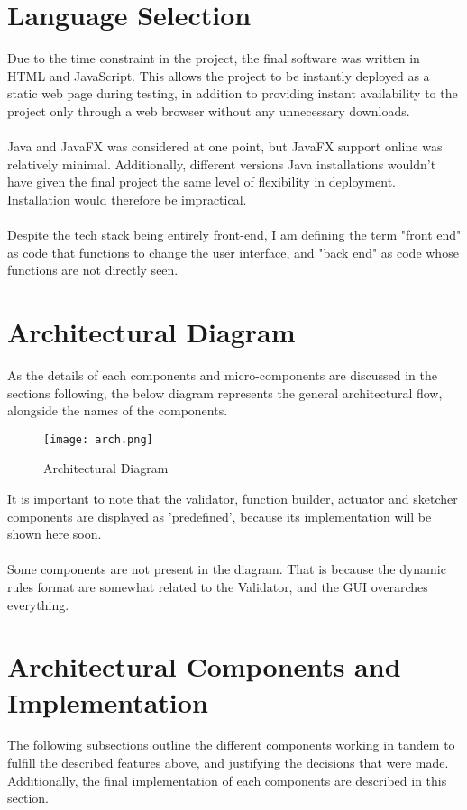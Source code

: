 \section{Language Selection}
Due to the time constraint in the project, the final software was written in HTML and JavaScript. This allows the project to be instantly deployed as a static web page during testing, in addition to providing instant availability to the project only through a web browser without any unnecessary downloads.
\\ \\
Java and JavaFX was considered at one point, but JavaFX support online was relatively minimal. Additionally, different versions Java installations wouldn't have given the final project the same level of flexibility in deployment. Installation would therefore be impractical. 
\\ \\
Despite the tech stack being entirely front-end, I am defining the term "front end" as code that functions to change the user interface, and "back end" as code whose functions are not directly seen.

\section{Architectural Diagram}
As the details of each components and micro-components are discussed in the sections following, the below diagram represents the general architectural flow, alongside the names of the components. 
\begin{figure}[H]
    \caption{Architectural Diagram}
    \centering
    \texttt{[image: arch.png]}
\end{figure}
\noindent It is important to note that the validator, function builder, actuator and sketcher components are displayed as 'predefined', because its implementation will be shown here soon. 
\\ \\
Some components are not present in the diagram. That is because the dynamic rules format are somewhat related to the Validator, and the GUI overarches everything. 

\section{Architectural Components and Implementation}
The following subsections outline the different components working in tandem to fulfill the described features above, and justifying the decisions that were made. Additionally, the final implementation of each components are described in this section.

